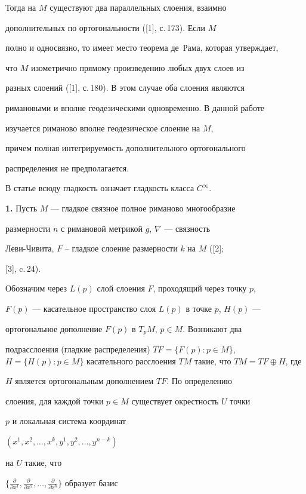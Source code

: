 Тогда на $M$ существуют два параллельных слоения, взаимно 


дополнительных по ортогональности ([1], с.\,173). Если $M$ 


полно и односвязно, то имеет место теорема де~Рама, которая утверждает, 


что $M$ изометрично прямому произведению любых двух слоев из 


разных слоений ([1], с.\,180). В этом случае оба слоения являются 


римановыми и вполне геодезическими одновременно. В данной работе 


изучается риманово вполне геодезическое слоение на $M$,


причем полная интегрируемость дополнительного ортогонального


распределения не предполагается. 


В статье всюду гладкость означает гладкость класса $C^\infty$.


\medskip





{\bf 1.} Пусть $M$ --- гладкое связное полное риманово многообразие 


размерности $n$ с римановой метрикой $g$, $\nabla$ --- связность


Леви-Чивита, $F$ -- гладкое слоение размерности $k$ на $M$ ([2];


[3], c.\,24). 


Обозначим через $L(p)$ слой слоения $F$, проходящий через точку $p$, 


$F(p)$ --- касательное пространство слоя $L(p)$ в точке $p$, $H(p)$ ---


ортогональное дополнение $F(p)$ в $T_pM$, $p\in M$. Возникают два 


подрасслоения (гладкие распределения) $TF=\{F(p) : p\in M\}$, $H=\{H(p): 


p\in M\}$ касательного расслоения $TM$ такие, что $TM=TF\oplus H$, где 


$H$ является ортогональным дополнением $TF$. По определению 


слоения, для каждой точки $p\in M$ существует окрестность $U$ точки 


$p$ и локальная система координат


$(x^1, x^2, \dotsc, x^k, y^1, y^2, \dotsc, y^{n-k})$ 


на $U$ такие, что


$\{\frac {\partial}{\partial x^1},\frac {\partial}{\partial 


x^2}, \dotsc, \frac {\partial}{\partial x^k}\}$ образует базис


